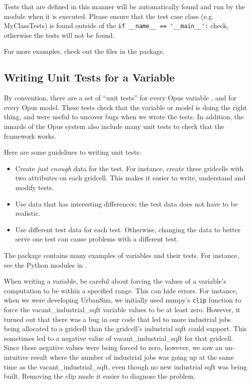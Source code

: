 Tests that are defined in this manner will be automatically found and run by the
 module when it is executed. Please ensure that the test case
class (e.g. MyClassTests) is found outside of the
\verb|if __name__ == '__main__':| check, otherwise the tests will not be found.

For more examples, check out the files in the  package.

\subsection{Writing Unit Tests for a Variable}
%
By convention, there are a set of ``unit tests'' for every Opus variable
\variablesindex, and for every Opus model.  These tests check that the variable
or model is doing the right thing, and were useful to uncover bugs when we wrote
the tests.  In addition, the innards of the Opus system also include
many unit tests to check that the framework works.

Here are some guidelines to writing unit tests:
\begin{itemize}
  \item Create \emph{just enough} data for the test.  For instance, create
  three gridcells with two attributes \attributesindex on each gridcell.  This
  makes it easier to write, understand and modify tests.
  \item Use data that has interesting differences; the test data does not have
  to be realistic.
  \item Use different test data for each test.  Otherwise, changing the data to
  better serve one test can cause problems with a different test.
\end{itemize}

The  package contains many examples of variables and their
tests.  For instance, see the Python modules in .

When writing a variable, be careful about forcing the values of a variable's
computation to be within a specified range.  This can hide
errors.  For instance, when we were developing UrbanSim, we initially used
numpy's \verb|clip| function to force the
vacant_industrial_sqft variable values to be at least zero.
However, it turned out that there was a bug in our code that led to more
industrial jobs being allocated to a gridcell than the gridcell's industrial
sqft could support.  This sometimes led to a negative value of
vacant_industrial_sqft for that gridcell.  Since these negative values were
being forced to zero, however, we saw an un-intuitive result where the number
of industrial jobs was going up at the same time as the vacant_industrial_sqft,
even though no new industrial sqft was being built. Removing the clip made it
easier to diagnose the problem.

